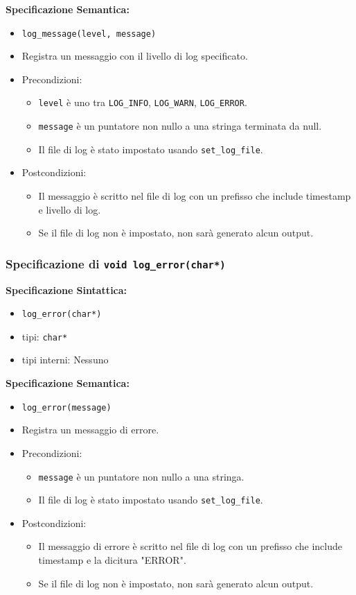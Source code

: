 \documentclass[11pt]{scrartcl} %
\begin{document}
\textbf{Specificazione Semantica:}
\begin{itemize}
	\item \texttt{log\_message(level, message)}
	\item Registra un messaggio con il livello di log specificato.
	\item Precondizioni:
	      \begin{itemize}
		      \item \texttt{level} è uno tra \texttt{LOG\_INFO}, \texttt{LOG\_WARN}, \texttt{LOG\_ERROR}.
		      \item \texttt{message} è un puntatore non nullo a una stringa terminata da null.
		      \item Il file di log è stato impostato usando \texttt{set\_log\_file}.
	      \end{itemize}
	\item Postcondizioni:
	      \begin{itemize}
		      \item Il messaggio è scritto nel file di log con un prefisso che include timestamp e livello di log.
		      \item Se il file di log non è impostato, non sarà generato alcun output.
	      \end{itemize}
\end{itemize}

\subsubsection{Specificazione di \texttt{void log\_error(char*)}}

\textbf{Specificazione Sintattica:}
\begin{itemize}
	\item \texttt{log\_error(char*)}
	\item tipi: \texttt{char*}
	\item tipi interni: Nessuno
\end{itemize}

\textbf{Specificazione Semantica:}
\begin{itemize}
	\item \texttt{log\_error(message)}
	\item Registra un messaggio di errore.
	\item Precondizioni:
	      \begin{itemize}
		      \item \texttt{message} è un puntatore non nullo a una stringa.
		      \item Il file di log è stato impostato usando \texttt{set\_log\_file}.
	      \end{itemize}
	\item Postcondizioni:
	      \begin{itemize}
		      \item Il messaggio di errore è scritto nel file di log con un prefisso che include timestamp e la dicitura "ERROR".
		      \item Se il file di log non è impostato, non sarà generato alcun output.
	      \end{itemize}
\end{itemize}
\end{document}
